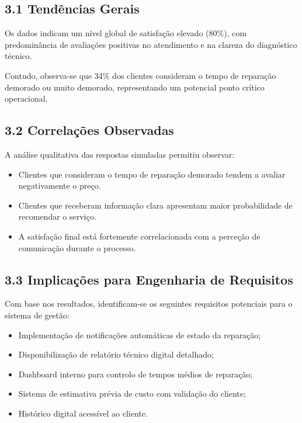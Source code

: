 \documentclass[11pt,a4paper]{article}
\begin{document}
\subsection*{3.1 Tendências Gerais}

Os dados indicam um nível global de satisfação elevado (80\%), com predominância de avaliações positivas no atendimento e na clareza do diagnóstico técnico. 

Contudo, observa-se que 34\% dos clientes consideram o tempo de reparação demorado ou muito demorado, representando um potencial ponto crítico operacional.

\vspace{0.6cm}

\subsection*{3.2 Correlações Observadas}

A análise qualitativa das respostas simuladas permitiu observar:

\begin{itemize}
	\item Clientes que consideram o tempo de reparação demorado tendem a avaliar negativamente o preço.
	\item Clientes que receberam informação clara apresentam maior probabilidade de recomendar o serviço.
	\item A satisfação final está fortemente correlacionada com a perceção de comunicação durante o processo.
\end{itemize}

\vspace{0.6cm}

\subsection*{3.3 Implicações para Engenharia de Requisitos}

Com base nos resultados, identificam-se os seguintes requisitos potenciais para o sistema de gestão:

\begin{itemize}
	\item Implementação de notificações automáticas de estado da reparação;
	\item Disponibilização de relatório técnico digital detalhado;
	\item Dashboard interno para controlo de tempos médios de reparação;
	\item Sistema de estimativa prévia de custo com validação do cliente;
	\item Histórico digital acessível ao cliente.
\end{itemize}
\end{document}
